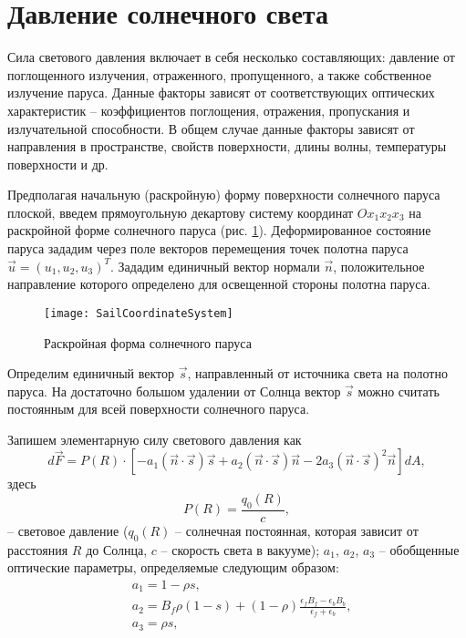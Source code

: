 \section{Давление солнечного света}
\noindent\indent Сила светового давления включает в себя несколько составляющих:
давление от поглощенного излучения, отраженного, пропущенного, а также собственное
излучение паруса. Данные факторы зависят от соответствующих оптических характеристик --
коэффициентов поглощения, отражения, пропускания и излучательной способности. В
общем случае данные факторы зависят от направления в пространстве, свойств поверхности,
длины волны, температуры поверхности и др.\par
  Предполагая начальную (раскройную) форму поверхности солнечного паруса плоской,
введем прямоугольную декартову систему координат $Ox_1x_2x_3$ на раскройной форме
солнечного паруса (рис. \ref{fig:SailCoordinateSystem}). Деформированное состояние
паруса зададим через поле векторов перемещения точек полотна паруса
$\vec{u} = (u_1, u_2, u_3)^T$. Зададим единичный вектор нормали $\vec{n}$,
положительное направление которого определено для освещенной стороны полотна паруса.
\begin{figure}[h]
  \centering
  \texttt{[image: SailCoordinateSystem]}
  \caption{Раскройная форма солнечного паруса}
  \label{fig:SailCoordinateSystem}
\end{figure}
Определим единичный вектор $\vec{s}$, направленный от источника света на полотно
паруса. На достаточно большом удалении от Солнца вектор $\vec{s}$ можно считать
постоянным для всей поверхности солнечного паруса.\par
  Запишем элементарную силу светового давления как
\begin{equation}
  d\vec{F} = P(R) \cdot \left[
    -a_{1}(\vec{n}\cdot\vec{s})\vec{s}
    +a_{2}(\vec{n}\cdot\vec{s})\vec{n}
    -2a_{3}(\vec{n}\cdot\vec{s})^2\vec{n}
  \right]dA,
\end{equation}
здесь
\begin{equation}
  P(R) = \frac{q_0(R)}{c},
\end{equation}
-- световое давление ($q_0(R)$ -- солнечная постоянная, которая зависит от
расстояния $R$ до Солнца, $c$ -- скорость света в вакууме); $a_{1}$, $a_{2}$,
$a_{3}$ -- обобщенные оптические параметры, определяемые следующим образом:
\begin{equation}
  \begin{aligned}
    & a_{1} = 1 - \rho s, \\
    & a_{2} = B_f\rho(1 - s) + (1 - \rho)\frac{\epsilon_f B_f - \epsilon_b B_b}{\epsilon_f + \epsilon_b}, \\
    & a_{3} = \rho s, \\
  \end{aligned}
\end{equation}
